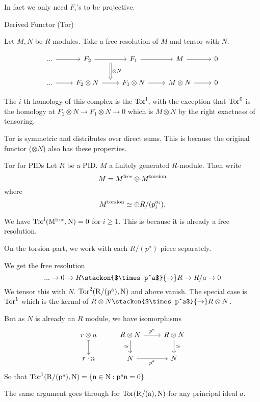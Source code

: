 \begin{remark}
    In fact we only need $F_i$'s to be projective. 
\end{remark}
\begin{adefinition}{Derived Functor (Tor)}{}
    
    Let $M,N$ be $R$-modules. Take a free resolution of $M$ and tensor with $N$.

    \[\begin{tikzcd}
	{...} & {F_2} & {F_1} & M & 0 \\
	{...} & {F_2\otimes N} & {F_1\otimes N} & {M\otimes N} & 0
	\arrow[from=1-1, to=1-2]
	\arrow[""{name=0, anchor=center, inner sep=0}, from=1-2, to=1-3]
	\arrow[from=1-3, to=1-4]
	\arrow[from=1-4, to=1-5]
	\arrow[from=2-1, to=2-2]
	\arrow[""{name=1, anchor=center, inner sep=0}, from=2-2, to=2-3]
	\arrow[from=2-3, to=2-4]
	\arrow[from=2-4, to=2-5]
	\arrow["{\otimes N}", shorten <=4pt, shorten >=4pt, Rightarrow, from=0, to=1]
\end{tikzcd}\]

The $i$-th homology of this complex is the $\rm{Tor} ^i$, with the exception that $\rm{Tor}^0$ is the homology at $F_2\otimes N\to F_1\otimes N \to 0$ which is $M\otimes N$ by the right exactness of tensoring.

\end{adefinition}
\begin{remark}
    Tor is symmetric and distributes over direct sums. This is because the original functor ($\otimes N$) also has these properties.
\end{remark}
\begin{aexample}{Tor for PIDs}{}
    Let $R$ be a PID. $M$ a finitely generated $R$-module. Then write \[
    M = M^{\rm{free}}\oplus M^{\rm{torsion}}
    \]
    where\[
    M^{\rm{torsion}}\simeq \oplus R/(p_i^{a_i}).
    \]

    We have $\rm{Tor}^i(M^{\rm{free}},N)=0$ for $i\geq 1$. This is because it is already a free resolution.
    
    On the torsion part, we work with each $R/(p^a)$ piece separately. 

    We get the free resolution \[
    ...\to 0\to R \stackon{$\times p^a$}{\to} R \to R/a \to 0
    \]
    We tensor this with $N$. $\rm{Tor}^2 (R/(p^a),N)$ and above vanish. The special case is $\rm{Tor}^1$ which is the kernal of $R\otimes N \stackon{$\times p^a$}{\to} R\otimes N$.

    But as $N$ is already an $R$ module, we have isomorphisms\[\begin{tikzcd}
	{r\otimes n} & {R\otimes N} & {R\otimes N} \\
	{r\cdot n} & N & N
	\arrow[maps to, from=1-1, to=2-1]
	\arrow["p^a", from=1-2, to=1-3]
	\arrow["\simeq"', from=1-2, to=2-2]
	\arrow["\simeq", from=1-3, to=2-3]
	\arrow["p^a"', from=2-2, to=2-3]
\end{tikzcd}\]
So that $\rm{Tor}^1(R/(p^a),N) = \{n\in N : p^an=0\}$.


The same argument goes through for $\rm{Tor}(R/(a),N)$ for any principal ideal $a$.
\end{aexample}
